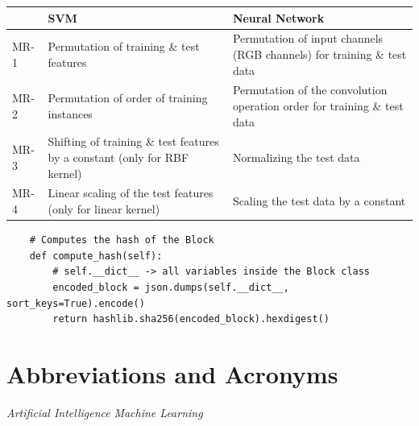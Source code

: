 \documentclass[12pt]{article}
\begin{document}
    \begin{table}[t]
        \centering
        \begin{tabular}{|C{.07\textwidth}|L{.41\textwidth}|L{.41\textwidth}|}
            \hline & \textbf{SVM} & \textbf{Neural Network} \\
            \hline MR-1 & Permutation of training \& test features & Permutation of input channels (RGB channels) for
training \& test data \\
            \hline MR-2 & Permutation of order of training instances & Permutation of the convolution operation order for
training \& test data \\
            \hline MR-3 & Shifting of training \& test features by a constant (only for RBF kernel) & Normalizing the test data \\
            \hline MR-4 & Linear scaling of the test features (only for linear kernel) & Scaling the test data by a constant \\
            \hline
        \end{tabular}

        \label{tab:relations}
    \end{table}

        \begin{center}
    \begin{lstlisting}
    # Computes the hash of the Block
    def compute_hash(self):
        # self.__dict__ -> all variables inside the Block class
        encoded_block = json.dumps(self.__dict__, sort_keys=True).encode()
        return hashlib.sha256(encoded_block).hexdigest()
    \end{lstlisting}
    \end{center}




\newpage

\section*{Abbreviations and Acronyms}
\begin{acronym}[Bash]
 {\textit{Artificial Intelligence}}
 {\textit{Machine Learning}}


\end{acronym}

\listoftables
\listoffigures


\end{document}
